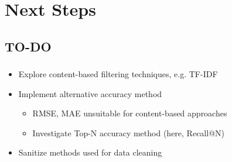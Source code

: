 \documentclass[aspectratio=169]{beamer}
\begin{document}
\section{Next Steps}
\frame{\vfill\centering\tableofcontents[sectionstyle=show/shaded,subsectionstyle=show/hide]\vfill}

\subsection{TO-DO}
\begin{frame}
	\frametitle{\insertsection}
	\framesubtitle{\insertsubsection}

	\begin{itemize}
		\item Explore content-based filtering techniques, e.g. TF-IDF
		\item Implement alternative accuracy method
		\begin{itemize}
			\item RMSE, MAE unsuitable for content-based approaches
			\item Investigate Top-N accuracy method (here, Recall@N)
		\end{itemize}
		\item Sanitize methods used for data cleaning
	\end{itemize}
\end{frame}
\end{document}
